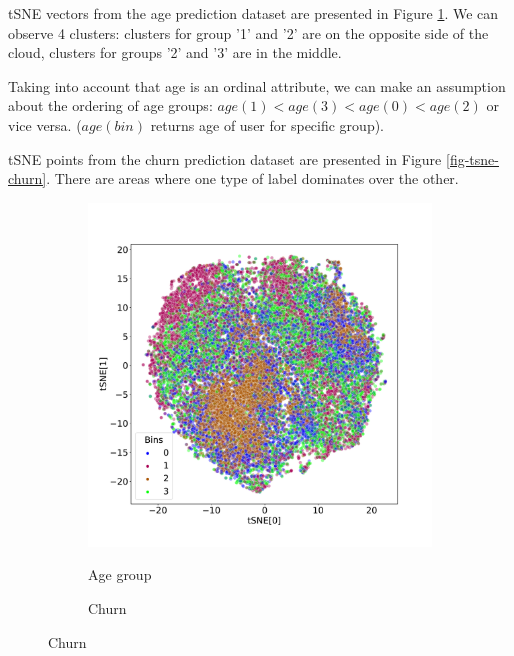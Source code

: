 \documentclass{article}
\begin{document}
tSNE vectors from the age prediction dataset are presented in Figure \ref{fig-tsne-age2}. We can observe 4 clusters: clusters for group '1' and '2' are on the opposite side of the cloud, clusters for groups '2' and '3' are in the middle.

Taking into account that age is an ordinal attribute, we can make an assumption about the ordering of age groups: $age(1) < age(3) < age(0) < age(2)$ or vice versa. ($age(bin)$ returns age of user for specific group).

tSNE points from the churn prediction dataset are presented in Figure \ref{fig-tsne-churn}. There are areas where one type of label dominates over the other.

\begin{figure}
  \centering
  \caption{2D tSNE mapping of CoLES embeddings colored by target labels}
  \begin{subfigure}{0.5\textwidth}
    \caption{Age group}
    \includegraphics[width=\textwidth]{figures/iclr-age-pred-tsne.pdf}
    \label{fig-tsne-age2}
  \end{subfigure}%
  \begin{subfigure}{0.5\textwidth}
    \caption{Churn}

\end{subfigure}
\end{figure}
\end{document}
